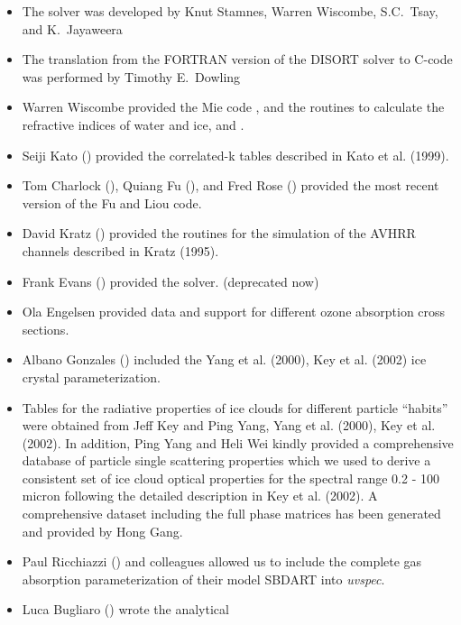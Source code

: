 \begin{itemize}
\item The  solver was developed by Knut Stamnes, Warren Wiscombe, 
  S.C.~Tsay, and K.~Jayaweera
\item The translation from the FORTRAN version of the DISORT solver to C-code was performed by Timothy E.~Dowling
\item Warren Wiscombe provided the Mie code , and the routines to calculate
  the refractive indices of water and ice,  and .
\item Seiji Kato () provided the 
  correlated-k tables described in Kato et al. (1999).
\item Tom Charlock (), Quiang Fu 
  (), 
  and Fred Rose () provided the most recent version 
  of the Fu and Liou code.
\item David Kratz () provided the routines 
  for the simulation of the AVHRR channels described in 
  Kratz (1995).
\item Frank Evans () provided the
   solver. (deprecated now)
\item Ola Engelsen provided data and support for different ozone 
absorption cross sections.
\item Albano Gonzales () included the Yang et
  al. (2000), Key et al. (2002) ice crystal parameterization. 
\item Tables for the radiative properties of ice clouds for different
  particle ``habits'' were obtained from Jeff Key and Ping Yang,
  Yang et al. (2000), Key et al. (2002). In addition, Ping Yang and 
  Heli Wei kindly provided a comprehensive database of particle 
  single scattering properties which we used to derive a consistent 
  set of ice cloud optical properties for the spectral range 0.2 - 100 micron 
  following the detailed description in Key et al. (2002).
  A comprehensive dataset including the full phase matrices has been 
  generated and provided by Hong Gang. 
\item Paul Ricchiazzi () and colleagues
  allowed us to include the complete gas absorption parameterization 
  of their model SBDART into {\sl uvspec}.
\item Luca Bugliaro () wrote the analytical 

\end{itemize}

